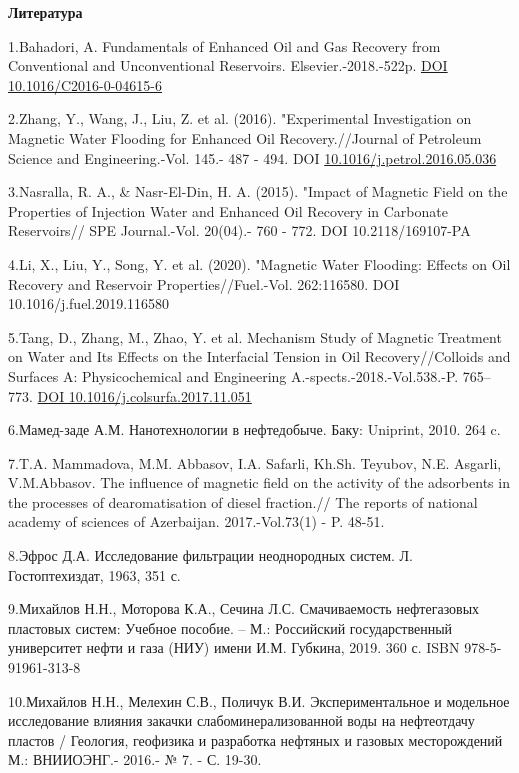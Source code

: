 \begin{center}
{\bfseries Литература}
\end{center}

\begin{references}
1.Bahadori, A. Fundamentals of Enhanced Oil and Gas Recovery from
Conventional and Unconventional Reservoirs. Elsevier.-2018.-522p.
\href{https://doi.org/10.1016/C2016-0-04615-6}{DOI
10.1016/C2016-0-04615-6}

2.Zhang, Y., Wang, J., Liu, Z. et al. (2016). "Experimental
Investigation on Magnetic Water Flooding for Enhanced Oil
Recovery.//Journal of Petroleum Science and Engineering.-Vol. 145.- 487
- 494. DOI
\href{https://doi.org/10.1016/j.petrol.2016.05.036}{10.1016/j.petrol.2016.05.036}

3.Nasralla, R. A., \& Nasr-El-Din, H. A. (2015). "Impact of Magnetic
Field on the Properties of Injection Water and Enhanced Oil Recovery in
Carbonate Reservoirs// SPE Journal.-Vol. 20(04).- 760 - 772. DOI
10.2118/169107-PA

4.Li, X., Liu, Y., Song, Y. et al. (2020). "Magnetic Water Flooding:
Effects on Oil Recovery and Reservoir Properties//Fuel.-Vol. 262:116580.
DOI 10.1016/j.fuel.2019.116580

5.Tang, D., Zhang, M., Zhao, Y. et al. Mechanism Study of Magnetic
Treatment on Water and Its Effects on the Interfacial Tension in Oil
Recovery//Colloids and Surfaces A: Physicochemical and Engineering
A.-spects.-2018.-Vol.538.-P. 765--773. \href{https://doi.org/10.1016/j.colsurfa.2017.11.051}{DOI
10.1016/j.colsurfa.2017.11.051}

6.Мамед-заде А.М. Нанотехнологии в нефтедобыче. Баку: Uniprint, 2010.
264 c.

7.T.A. Mammadova, M.M. Abbasov, I.A. Safarli, Kh.Sh. Teyubov, N.E.
Asgarli, V.M.Abbasov. The influence of magnetic field on the activity of
the adsorbents in the processes of dearomatisation of diesel fraction.//
The reports of national academy of sciences of Azerbaijan.
2017.-Vol.73(1) - P. 48-51.

8.Эфрос Д.А. Исследование фильтрации неоднородных систем. Л.
Гостоптехиздат, 1963, 351 с.

9.Михайлов Н.Н., Моторова К.А., Сечина Л.С. Смачиваемость нефтегазовых
пластовых систем: Учебное пособие. -- М.: Российский государственный
университет нефти и газа (НИУ) имени И.М. Губкина, 2019. 360 с. ISBN
978-5-91961-313-8

10.Михайлов Н.Н., Мелехин С.В., Поличук В.И. Экспериментальное и
модельное исследование влияния закачки слабоминерализованной воды на
нефтеотдачу пластов / Геология, геофизика и разработка нефтяных и
газовых месторождений М.: ВНИИОЭНГ.- 2016.- № 7. - С. 19-30.


\end{references}
